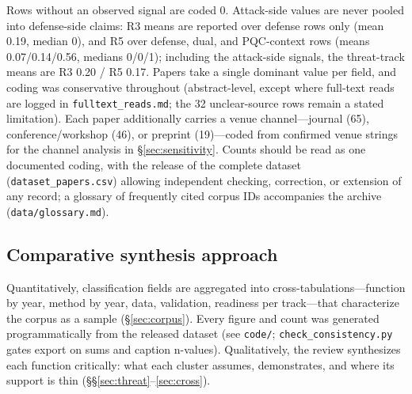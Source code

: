 Rows without an observed signal are coded 0. Attack-side values are never pooled into defense-side claims: R3 means are reported over defense rows only (mean 0.19, median 0), and R5 over defense, dual, and PQC-context rows (means 0.07/0.14/0.56, medians 0/0/1); including the attack-side signals, the threat-track means are R3 0.20 / R5 0.17. Papers take a single dominant value per field, and coding was conservative throughout (abstract-level, except where full-text reads are logged in \texttt{fulltext\_reads.md}; the 32 unclear-source rows remain a stated limitation). Each paper additionally carries a venue channel---journal (65), conference/workshop (46), or preprint (19)---coded from confirmed venue strings for the channel analysis in \S\ref{sec:sensitivity}. Counts should be read as one documented coding, with the release of the complete dataset (\texttt{dataset\_papers.csv}) allowing independent checking, correction, or extension of any record; a glossary of frequently cited corpus IDs accompanies the archive (\texttt{data/glossary.md}).

\subsection{Comparative synthesis approach}
Quantitatively, classification fields are aggregated into cross-tabulations---function by year, method by year, data, validation, readiness per track---that characterize the corpus as a sample (\S\ref{sec:corpus}). Every figure and count was generated programmatically from the released dataset (see \texttt{code/}; \texttt{check\_consistency.py} gates export on sums and caption n-values). Qualitatively, the review synthesizes each function critically: what each cluster assumes, demonstrates, and where its support is thin (\S\S\ref{sec:threat}--\ref{sec:cross}).

